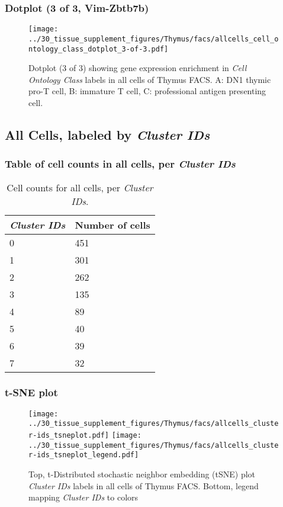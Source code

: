 \clearpage

\subsubsection{Dotplot (3 of 3, Vim-Zbtb7b)}
\begin{figure}[h]
\centering
\texttt{[image: ../30\_tissue\_supplement\_figures/Thymus/facs/allcells\_cell\_ontology\_class\_dotplot\_3-of-3.pdf]}

\caption{ Dotplot (3 of 3)  showing gene expression enrichment in \emph{Cell Ontology Class} labels in all cells of Thymus FACS. A: DN1 thymic pro-T cell, B: immature T cell, C: professional antigen presenting cell.}
\end{figure}


\clearpage

\subsection{All Cells, labeled by \emph{Cluster IDs}}
\subsubsection{Table of cell counts in all cells, per \emph{Cluster IDs}}\begin{table}[h]
\centering
\label{my-label}
\begin{tabular}{@{}ll@{}}
\toprule

\emph{Cluster IDs}& Number of cells \\ \midrule
0 & 451 \\

1 & 301 \\

2 & 262 \\

3 & 135 \\

4 & 89 \\

5 & 40 \\

6 & 39 \\

7 & 32 \\
\bottomrule
\end{tabular}
\caption{Cell counts for all cells, per \emph{Cluster IDs}.}
\end{table}

\clearpage
\subsubsection{t-SNE plot}
\begin{figure}[h]
\centering
\texttt{[image: ../30\_tissue\_supplement\_figures/Thymus/facs/allcells\_cluster-ids\_tsneplot.pdf]}
\texttt{[image: ../30\_tissue\_supplement\_figures/Thymus/facs/allcells\_cluster-ids\_tsneplot\_legend.pdf]}
\caption{Top, t-Distributed stochastic neighbor embedding (tSNE) plot  \emph{Cluster IDs} labels in all cells of Thymus FACS. Bottom, legend mapping \emph{Cluster IDs} to colors}
\end{figure}


